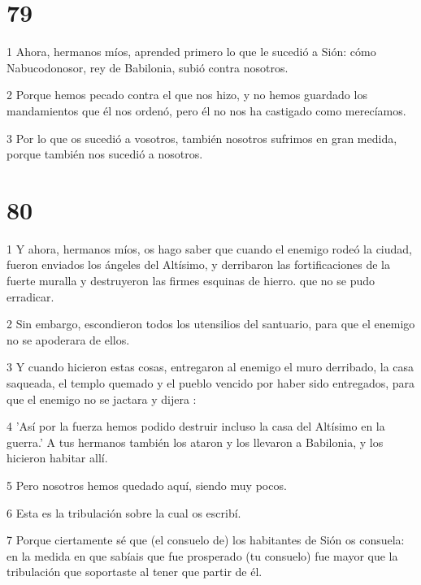 \chapter{79}

\par 1 Ahora, hermanos míos, aprended primero lo que le sucedió a Sión: cómo Nabucodonosor, rey de Babilonia, subió contra nosotros.

\par 2 Porque hemos pecado contra el que nos hizo, y no hemos guardado los mandamientos que él nos ordenó, pero él no nos ha castigado como merecíamos.

\par 3 Por lo que os sucedió a vosotros, también nosotros sufrimos en gran medida, porque también nos sucedió a nosotros.

\chapter{80}

\par 1 Y ahora, hermanos míos, os hago saber que cuando el enemigo rodeó la ciudad, fueron enviados los ángeles del Altísimo, y derribaron las fortificaciones de la fuerte muralla y destruyeron las firmes esquinas de hierro. que no se pudo erradicar.

\par 2 Sin embargo, escondieron todos los utensilios del santuario, para que el enemigo no se apoderara de ellos.

\par 3 Y cuando hicieron estas cosas, entregaron al enemigo el muro derribado, la casa saqueada, el templo quemado y el pueblo vencido por haber sido entregados, para que el enemigo no se jactara y dijera :

\par 4 'Así por la fuerza hemos podido destruir incluso la casa del Altísimo en la guerra.' A tus hermanos también los ataron y los llevaron a Babilonia, y los hicieron habitar allí.

\par 5 Pero nosotros hemos quedado aquí, siendo muy pocos.

\par 6 Esta es la tribulación sobre la cual os escribí.

\par 7 Porque ciertamente sé que (el consuelo de) los habitantes de Sión os consuela: en la medida en que sabíais que fue prosperado (tu consuelo) fue mayor que la tribulación que soportaste al tener que partir de él.

